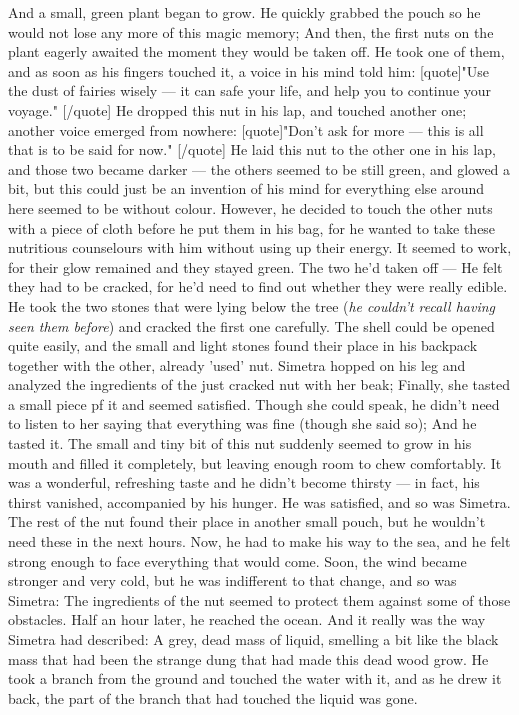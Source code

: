And a small, green plant began to grow. He quickly grabbed the pouch so he would not lose any more of this magic memory; And then, the first nuts on the plant eagerly awaited the moment they would be taken off. 
He took one of them, and as soon as his fingers touched it, a voice in his mind told him: 
[quote]"Use the dust of fairies wisely --- 
it can safe your life, and help you to continue your voyage."
[/quote]
He dropped this nut in his lap, and touched another one; another voice emerged from nowhere:
[quote]"Don't ask for more --- 
this is all that is to be said for now."
[/quote]
He laid this nut to the other one in his lap, and those two became darker --- the others seemed to be still green, and glowed a bit, but this could just be an invention of his mind for everything else around here seemed to be without colour. 
However, he decided to touch the other nuts with a piece of cloth before he put them in his bag, for he wanted to take these nutritious counselours with him without using up their energy. It seemed to work, for their glow remained and they stayed green. The two he'd taken off --- He felt they had to be cracked, for he'd need to find out whether they were really edible. He took the two stones that were lying below the tree (\emph{he couldn't recall having seen them before}) and cracked the first one carefully. The shell could be opened quite easily, and the small and light stones found their place in his backpack together with the other, already 'used' nut. Simetra hopped on his leg and analyzed the ingredients of the just cracked nut with her beak; Finally, she tasted a small piece pf it and seemed satisfied. Though she could speak, he didn't need to listen to her saying that everything was fine (though she said so); And he tasted it. 
The small and tiny bit of this nut suddenly seemed to grow in his mouth and filled it completely, but leaving enough room to chew comfortably. It was a wonderful, refreshing taste and he didn't become thirsty --- in fact, his thirst vanished, accompanied by his hunger. 
He was satisfied, and so was Simetra. The rest of the nut found their place in another small pouch, but he wouldn't need these in the next hours. 
Now, he had to make his way to the sea, and he felt strong enough to face everything that would come. 
Soon, the wind became stronger and very cold, but he was indifferent to that change, and so was Simetra: The ingredients of the nut seemed to protect them against some of those obstacles. Half an hour later, he reached the ocean. 
And it really was the way Simetra had described: A grey, dead mass of liquid, smelling a bit like the black mass that had been the strange dung that had made this dead wood grow. He took a branch from the ground and touched the water with it, and as he drew it back, the part of the branch that had touched the liquid was gone. 

